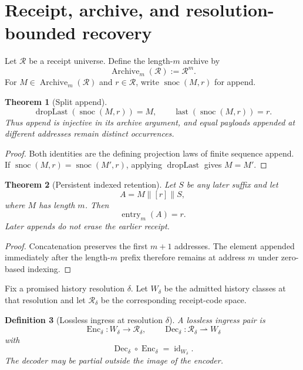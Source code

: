 \documentclass[11pt]{article}
\newtheorem{theorem}{Theorem}[section]
\newtheorem{definition}[theorem]{Definition}
\begin{document}
\section{Receipt, archive, and resolution-bounded recovery}
Let $\mathcal R$ be a receipt universe. Define the length-$m$ archive by
\[
\operatorname{Archive}_m(\mathcal R):=\mathcal R^m.
\]
For $M\in\operatorname{Archive}_m(\mathcal R)$ and $r\in\mathcal R$, write $\operatorname{snoc}(M,r)$ for append.

\begin{theorem}[Split append]\label{thm:split-append}
\[
\operatorname{dropLast}(\operatorname{snoc}(M,r))=M,
\qquad
\operatorname{last}(\operatorname{snoc}(M,r))=r.
\]
Thus append is injective in its archive argument, and equal payloads appended at different addresses remain distinct occurrences.
\end{theorem}
\begin{proof}
Both identities are the defining projection laws of finite sequence append. If $\operatorname{snoc}(M,r)=\operatorname{snoc}(M',r)$, applying $\operatorname{dropLast}$ gives $M=M'$.
\end{proof}

\begin{theorem}[Persistent indexed retention]\label{thm:indexed-retention}
Let $S$ be any later suffix and let
\[
A=M\mathbin{\|}[r]\mathbin{\|}S,
\]
where $M$ has length $m$. Then
\[
\operatorname{entry}_m(A)=r.
\]
Later appends do not erase the earlier receipt.
\end{theorem}
\begin{proof}
Concatenation preserves the first $m+1$ addresses. The element appended immediately after the length-$m$ prefix therefore remains at address $m$ under zero-based indexing.
\end{proof}

Fix a promised history resolution $\delta$. Let $W_\delta$ be the admitted history classes at that resolution and let $\mathcal R_\delta$ be the corresponding receipt-code space.

\begin{definition}[Lossless ingress at resolution $\delta$]\label{def:ingress}
A lossless ingress pair is
\[
\operatorname{Enc}_\delta:W_\delta\to\mathcal R_\delta,
\qquad
\operatorname{Dec}_\delta:\mathcal R_\delta\rightharpoonup W_\delta
\]
with
\[
\operatorname{Dec}_\delta\circ\operatorname{Enc}_\delta
=
\operatorname{id}_{W_\delta}.
\]
The decoder may be partial outside the image of the encoder.
\end{definition}
\end{document}
